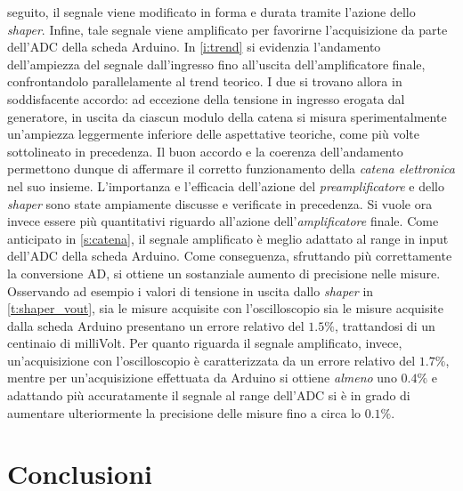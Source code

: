 \documentclass[a4paper,11pt]{article} %
\begin{document}
seguito, il segnale viene modificato in forma e durata tramite l'azione dello \textit{shaper}. Infine, tale segnale
viene amplificato per favorirne l'acquisizione da parte dell'ADC della scheda Arduino. In \autoref{i:trend} si evidenzia
l'andamento dell'ampiezza del segnale dall'ingresso fino all'uscita dell'amplificatore finale, confrontandolo
parallelamente al trend teorico. I due si trovano allora in soddisfacente accordo: ad eccezione della tensione in
ingresso erogata dal generatore, in uscita da ciascun modulo della catena si misura sperimentalmente un'ampiezza
leggermente inferiore delle aspettative teoriche, come più volte sottolineato in precedenza. Il buon accordo e la
coerenza dell'andamento permettono dunque di affermare il corretto funzionamento della \textit{catena elettronica} nel
suo insieme. L'importanza e l'efficacia dell'azione del \textit{preamplificatore} e dello \textit{shaper} sono state
ampiamente discusse e verificate in precedenza. Si vuole ora invece essere più quantitativi riguardo all'azione
dell'\textit{amplificatore} finale. Come anticipato in \autoref{s:catena}, il segnale amplificato è meglio adattato al
range in input dell'ADC della scheda Arduino. Come conseguenza, sfruttando più correttamente la conversione AD, si
ottiene un sostanziale aumento di precisione nelle misure. Osservando ad esempio i valori di tensione in uscita dallo
\textit{shaper} in \autoref{t:shaper_vout}, sia le misure acquisite con l'oscilloscopio sia le misure acquisite dalla
scheda Arduino presentano un errore relativo del $1.5\%$, trattandosi di un centinaio di milliVolt. Per quanto riguarda
il segnale amplificato, invece, un'acquisizione con l'oscilloscopio è caratterizzata da un errore relativo del $1.7\%$,
mentre per un'acquisizione effettuata da Arduino si ottiene \textit{almeno} uno $0.4\%$ e adattando più accuratamente il
segnale al range dell'ADC si è in grado di aumentare ulteriormente la precisione delle misure fino a circa lo $0.1\%$. 



\section{Conclusioni}\label{s:conclusioni}
\end{document}
